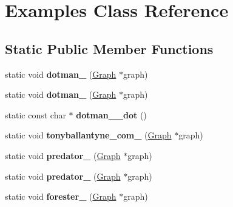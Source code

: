 \hypertarget{class_examples}{}\section{Examples Class Reference}
\label{class_examples}
\subsection*{Static Public Member Functions}
\begin{DoxyCompactItemize}
\item 
static void {\bfseries dotman\+\_} (\hyperlink{classmemgraph_1_1_graph}{Graph} $\ast$graph)\hypertarget{class_examples_a4e8cb6f2c3dde9074e7a956a3a922eae}{}\label{class_examples_a4e8cb6f2c3dde9074e7a956a3a922eae}

\item 
static void {\bfseries dotman\+\_} (\hyperlink{classmemgraph_1_1_graph}{Graph} $\ast$graph)\hypertarget{class_examples_a1a6dfb3bece9fc24385d61413c85f6e2}{}\label{class_examples_a1a6dfb3bece9fc24385d61413c85f6e2}

\item 
static const char $\ast$ {\bfseries dotman\+\_\+\_\+dot} ()\hypertarget{class_examples_a6137650ee527dab92a9adc455f7f96a3}{}\label{class_examples_a6137650ee527dab92a9adc455f7f96a3}

\item 
static void {\bfseries tonyballantyne\+\_\+com\+\_} (\hyperlink{classmemgraph_1_1_graph}{Graph} $\ast$graph)\hypertarget{class_examples_a9582a72222b1c3b6640904d682df6974}{}\label{class_examples_a9582a72222b1c3b6640904d682df6974}

\item 
static void {\bfseries predator\+\_} (\hyperlink{classmemgraph_1_1_graph}{Graph} $\ast$graph)\hypertarget{class_examples_af71591375625793c0f94d42f4b9878d7}{}\label{class_examples_af71591375625793c0f94d42f4b9878d7}

\item 
static void {\bfseries predator\+\_} (\hyperlink{classmemgraph_1_1_graph}{Graph} $\ast$graph)\hypertarget{class_examples_a8683c90dfdf00608cae98553c3a98a3e}{}\label{class_examples_a8683c90dfdf00608cae98553c3a98a3e}

\item 
static void {\bfseries forester\+\_} (\hyperlink{classmemgraph_1_1_graph}{Graph} $\ast$graph)\hypertarget{class_examples_af767ed7257c08ee66a423b17f5b66ec1}{}\label{class_examples_af767ed7257c08ee66a423b17f5b66ec1}


\end{DoxyCompactItemize}
